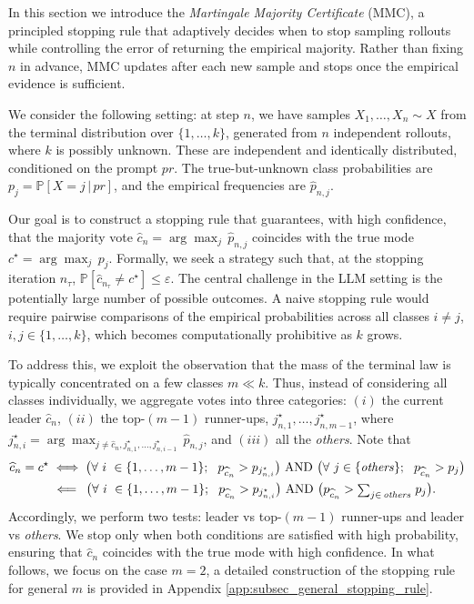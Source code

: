 In this section we introduce the \emph{Martingale Majority Certificate} (MMC), a principled stopping rule that adaptively decides when to stop sampling rollouts while controlling the error of returning the empirical majority. Rather than fixing $n$ in advance, MMC updates after each
new sample and stops once the empirical evidence is sufficient.

We consider the following setting: 
at step $n$, we have samples $X_1, \dots, X_n \sim X$  from the terminal distribution over $\{1, \dots, k\}$, generated from $n$ independent rollouts, where $k$ is possibly unknown.  These are independent and identically distributed, conditioned on the prompt $pr$.
The true-but-unknown class probabilities are $p_j = \mathbb{P}[X=j\,|\,pr]$, and the empirical frequencies are
$\hat{p}_{n,j}$. 

Our goal is to construct a stopping rule that guarantees, with high confidence, that the majority vote $\widehat{c}_n = \arg\max_j\, \hat{p}_{n,j} $ coincides with the true mode $c^\star = \arg\max_j\, {p}_{j}$. Formally, we seek a strategy such that, at the stopping iteration $n_\tau$, 
$
\mathbb{P}\left[\widehat{c}_{n_\tau}\neq c^\star\right]\leq \varepsilon.
$
 The central challenge in the LLM setting is the potentially large number of possible outcomes. A naive stopping rule would require pairwise comparisons of the empirical probabilities across all classes $i \neq j$, $i,j \in\{1, \dots, k\}$, which becomes computationally prohibitive as $k$ grows.   

To address this, we exploit the observation that the mass of the terminal law is typically concentrated on a few classes $m\ll k$.  Thus, instead of considering all classes individually, we aggregate votes into three categories: $(i)$ the current leader $\widehat{c}_n$, $(ii)$ the top-$(m-1)$ runner-ups, $j_{n,1}^\star, \dots, j_{n,m-1}^\star$, where $j_{n,i}^\star = \arg\max_{j\neq \widehat{c}_n, j_{n,1}^\star,\dots, j_{n,i-1}^\star} \,\hat{p}_{n,j}$, and $(iii)$ all the \emph{others}.
Note that
\small
\begin{align*}
\widehat{c}_n = c^\star 
&\iff \big(\forall \ i\ \in\{1,\dots, m-1\};\ \ p_{\widehat{c}_n}> p_{j_{n,i}^\star}\big)\ \text{AND}\ \big(\forall \ j \in \text{\{\emph{others}\}};\ \  p_{\widehat{c}_n}> p_j\big)\\
&\,\,\Longleftarrow \,\,\,\big(\forall \ i\ \in\{1,\dots, m-1\};\ \ p_{\widehat{c}_n}> p_{j_{n,i}^\star}\big)\ \text{AND}\ \big(  p_{\widehat{c}_n}> {\scriptstyle\sum}_{j\in\, \textit{others}}\, \, p_j\big).
\end{align*}
\normalsize
Accordingly, we perform two tests: leader vs top-$(m-1)$ runner-ups and leader vs \emph{others}.
We stop only when both conditions are satisfied with high probability, ensuring that $\widehat{c}_n$ coincides with the true mode with high confidence. 
In what follows, we focus on the case $m=2$, a detailed construction of the stopping rule for general $m$ is provided in Appendix \ref{app:subsec_general_stopping_rule}.

